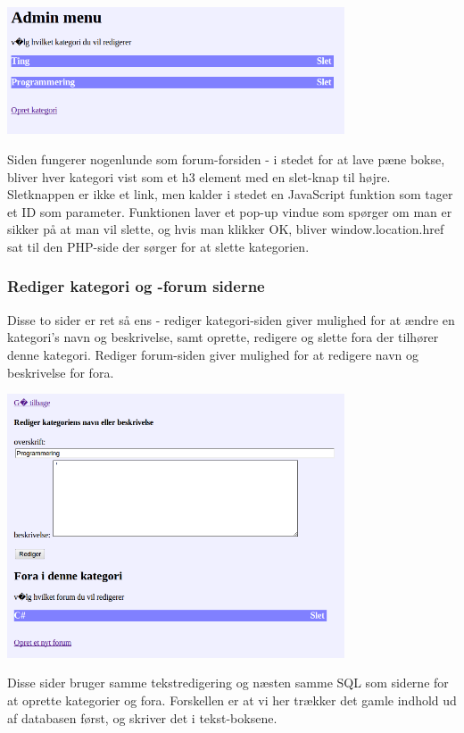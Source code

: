 \documentclass{article}
\begin{document}
\includegraphics[width=100mm]{mi01.png}

Siden fungerer nogenlunde som forum-forsiden - i stedet for at lave pæne bokse, bliver hver kategori vist som et h3 element med en slet-knap til højre. Sletknappen er ikke et link, men kalder i stedet en JavaScript funktion som tager et ID som parameter. Funktionen laver et pop-up vindue som spørger om man er sikker på at man vil slette, og hvis man klikker OK, bliver window.location.href sat til den PHP-side der sørger for at slette kategorien.



\subsubsection{Rediger kategori og -forum siderne}
Disse to sider er ret så ens - rediger kategori-siden giver mulighed for at ændre en kategori's navn og beskrivelse, samt oprette, redigere og slette fora der tilhører denne kategori. Rediger forum-siden giver mulighed for at redigere navn og beskrivelse for fora.

\includegraphics[width=100mm]{mi02.png}

Disse sider bruger samme tekstredigering og næsten samme SQL som siderne for at oprette kategorier og fora. Forskellen er at vi her trækker det gamle indhold ud af databasen først, og skriver det i tekst-boksene.
\end{document}
